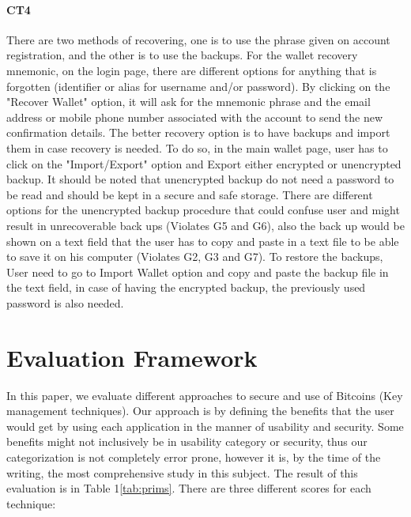 \paragraph{CT4} There are two methods of recovering, one is to use the phrase given on account registration, and the other is to use the backups. For the wallet recovery mnemonic, on the login page, there are different options for anything that is forgotten (identifier or alias for username and/or password). By clicking on the "Recover Wallet" option, it will ask for the mnemonic phrase and the email address or mobile phone number associated with the account to send the new confirmation details. The better recovery option is to have backups and import them in case recovery is needed. To do so, in the main wallet page, user has to click on the "Import/Export" option and Export either encrypted or unencrypted backup. It should be noted that unencrypted backup do not need a password to be read and should be kept in a secure and safe storage. There are different options for the unencrypted backup procedure that could confuse user and might result in unrecoverable back ups (Violates G5 and G6), also the back up would be shown on a text field that the user has to copy and paste in a text file to be able to save it on his computer (Violates G2, G3 and G7). To restore the backups, User need to go to Import Wallet option and copy and paste the backup file in the text field, in case of having the encrypted backup, the previously used password is also needed. 




\section{Evaluation Framework}

In this paper, we evaluate different approaches to secure and use of Bitcoins (Key management techniques). Our approach is by defining the benefits that the user would get by using each application in the manner of usability and security.
Some benefits might not inclusively be in usability category or security, thus our categorization is not completely error prone, however it is, by the time of the writing, the most comprehensive  study in this subject.
The result of this evaluation is in Table 1\ref{tab:prims}. There are three different scores for each technique:\\

